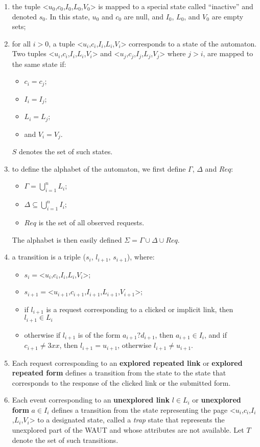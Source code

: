\documentclass[a4paper,10pt]{article}
\newcommand{\req}[1]{<$u_{#1}$,$c_{#1}$,$I_{#1}$,$L_{#1}$,$V_{#1}$>}
\begin{document}
\begin{enumerate}
  \item the tuple \req{0} is mapped to a special state called ``inactive'' and denoted $s_0$. In this state, $u_0$ and $c_0$ are null, and $I_0$, $L_0$, and $V_0$ are empty sets;
  \item for all $i > 0$, a tuple \req{i} corresponds to a state of the automaton. Two tuples \req{i} and \req{j} where $j > i$, are mapped to the same state if:
    \begin{itemize}
      \item $c_i = c_j$; 
      \item $I_i = I_j$; 
      \item $L_i = L_j$; 
      \item and $V_i = V_j$. 
    \end{itemize}
    $S$ denotes the set of such states.

  \item to define the alphabet of the automaton, we first define $\Gamma$, $\Delta$ and $Req$:
    \begin{itemize}
      \item $\Gamma = \displaystyle\bigcup_{i=1}^{n} L_i$;
      \item $\Delta \subseteq \displaystyle\bigcup_{i=1}^{n} I_i$;
      \item $Req$ is the set of all observed requests.
    \end{itemize}
    The alphabet is then easily defined $\Sigma = \Gamma \cup \Delta \cup Req$.

  \item a transition is a triple ($s_i$, $l_{i+1}$, $s_{i+1}$), where:
    \begin{itemize}
      \item $s_i =$\req{i};
      \item $s_{i+1} =$\req{i+1};
      \item  if $l_{i+1}$ is a request corresponding to a clicked or implicit link, then $l_{i+1} \in L_i$ 
      \item otherwise if $l_{i+1}$ is of the form $a_{i+1}?d_{i+1}$, then $a_{i+1} \in I_i$, and  if $c_{i+1} \neq 3xx$, then $l_{i+1} = u_{i+1}$, otherwise $l_{i+1} \neq u_{i+1}$.
    \end{itemize}

  \item Each request corresponding to an \textbf{explored repeated link} or \textbf{explored repeated form} defines a transition from the state to the state that corresponds to the response of the clicked link or the submitted form.
  \item Each event corresponding to an \textbf{unexplored link} $l \in L_i$ or \textbf{unexplored form} $a \in I_i$ defines a transition from the state representing the page \req{i} to a designated state, called a \emph{trap} state that represents the unexplored part of the WAUT and whose attributes are not available. Let $T$ denote the set of such transitions.
\end{enumerate}
\end{document}
